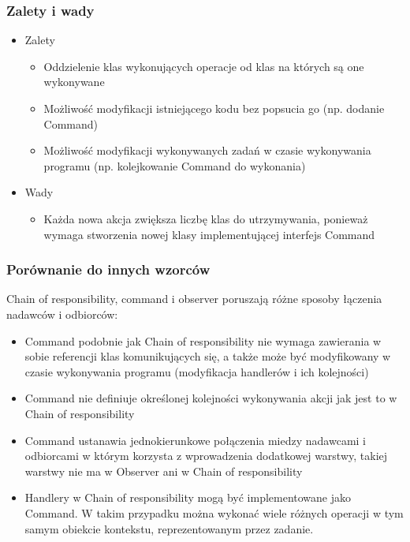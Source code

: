 \documentclass[a4paper,15pt]{article}
\begin{document}
\subsubsection{Zalety i wady}
\begin{itemize}
\item Zalety
\begin{itemize}
\item Oddzielenie klas wykonujących operacje od klas na których są one wykonywane
\item Możliwość modyfikacji istniejącego kodu bez popsucia go (np. dodanie Command)
\item Możliwość modyfikacji wykonywanych zadań w czasie wykonywania programu (np. kolejkowanie Command do wykonania)
\end{itemize}
\item Wady
\begin{itemize}
\item Każda nowa akcja zwiększa liczbę klas do utrzymywania, ponieważ wymaga stworzenia nowej klasy implementującej interfejs Command
\end{itemize}
\end{itemize}


\subsubsection{Porównanie do innych wzorców}

Chain of responsibility, command i observer poruszają różne sposoby łączenia nadawców i odbiorców: 

\begin{itemize}
\item Command podobnie jak Chain of responsibility  nie wymaga zawierania w sobie referencji klas komunikujących się, a także może być modyfikowany w czasie wykonywania programu (modyfikacja handlerów i ich kolejności)
\item Command nie definiuje określonej kolejności wykonywania akcji jak jest to w Chain of responsibility 
\item Command ustanawia jednokierunkowe połączenia miedzy nadawcami i odbiorcami w którym korzysta z wprowadzenia dodatkowej warstwy, takiej warstwy nie ma w Observer ani w Chain of responsibility
\end{itemize}

\begin{itemize}
\item Handlery w Chain of responsibility mogą być implementowane jako Command. W takim przypadku można wykonać wiele różnych operacji w tym samym obiekcie kontekstu, reprezentowanym przez zadanie.
\end{itemize}
\end{document}
